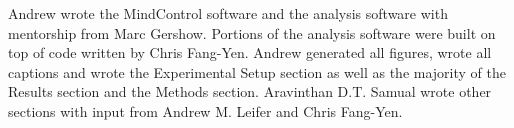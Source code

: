 Andrew wrote the MindControl software and the analysis software with mentorship from Marc Gershow. Portions of the analysis software were built on top of code written by Chris Fang-Yen. Andrew generated all figures, wrote all captions and wrote the Experimental Setup section as well as the majority of the Results section and the Methods section.  Aravinthan D.T. Samual wrote other sections with input from Andrew M. Leifer and Chris Fang-Yen.  